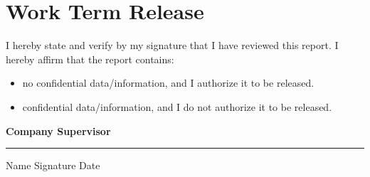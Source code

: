 \section*{\hfill Work Term Release \hfill}

\vspace{1.4cm}

\large
\noindent
I hereby state and verify by my signature that I have reviewed this report. 
I hereby affirm that the report contains:

\begin{itemize}
\item[$\square$] no confidential data/information, and I authorize it to be released.
\item[$\square$] confidential data/information, and I do not authorize it to be released. 
\end{itemize}

\vspace{1.6cm}
\noindent
\textbf{\large Company Supervisor}

\normalsize
\vspace{2cm}
\hrule 
\vspace{0.2cm}
\noindent Name \hspace{7cm} Signature \hspace{3cm} Date